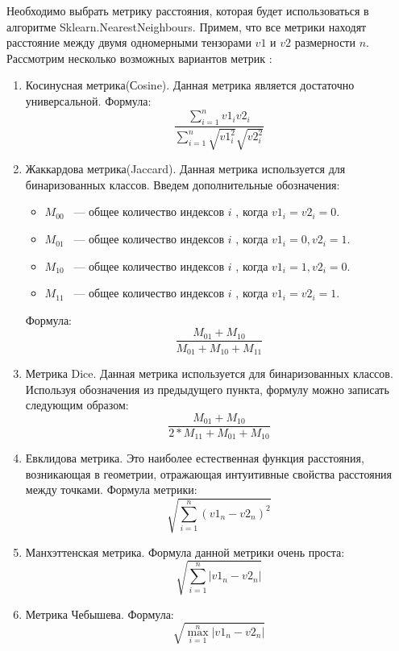 \documentclass[14pt]{mmcs_article}
\begin{document}
Необходимо выбрать метрику расстояния, которая будет использоваться в алгоритме Sklearn.NearestNeighbours. Примем, что все метрики находят расстояние между двумя одномерными тензорами $v1$ и $v2$ размерности $n$.  Рассмотрим несколько возможных вариантов метрик :
\begin{enumerate}
	\item Косинусная метрика(Сosine). Данная метрика является достаточно универсальной. Формула: \begin{equation}
		\frac{\sum_{i=1}^n v1_i v2_i}{\sum_{i=1}^n \sqrt{v1_i^2}\sqrt{v2_i^2}}
	\end{equation} 
	\item Жаккардова метрика(Jaccard). Данная метрика используется для бинаризованных классов. Введем дополнительные обозначения: 
	\begin{itemize}
		\item $M_{00}$ ~--- общее количество индексов $i$ , когда $v1_i = v2_i = 0$.
		\item $M_{01}$ ~--- общее количество индексов $i$ , когда $v1_i = 0,  v2_i = 1$.
		\item $M_{10}$ ~--- общее количество индексов $i$ , когда $v1_i = 1, v2_i = 0$.
		\item $M_{11}$ ~--- общее количество индексов $i$ , когда $v1_i = v2_i = 1$.
	\end{itemize}
	 Формула:
	\begin{equation}
		\frac{M_{01} + M_{10}}{M_{01} + M_{10} + M_{11}}
	\end{equation}
	\item Метрика Dice. Данная метрика используется для бинаризованных классов. Используя обозначения из предыдущего пункта, формулу можно записать следующим образом:
	\begin{equation}
		\frac{M_{01} + M_{10}}{2 * M_{11} + M_{01} + M_{10}}
	\end{equation}
	\item Евклидова метрика. Это наиболее естественная функция расстояния, возникающая в геометрии, отражающая интуитивные свойства расстояния между точками. Формула метрики:
	 \begin{equation}
		\sqrt{\sum_{i=1}^n (v1_n - v2_n)^2 }
	\end{equation} 
	\item Манхэттенская метрика.  Формула данной метрики очень проста: 
	 \begin{equation}
		\sqrt{\sum_{i=1}^n | v1_n - v2_n | }
	\end{equation} 
	\item Метрика Чебышева. Формула:
	 \begin{equation}
		\sqrt{\max_{i=1}^n | v1_n - v2_n | }
	\end{equation} 
\end{enumerate} 
\end{document}
